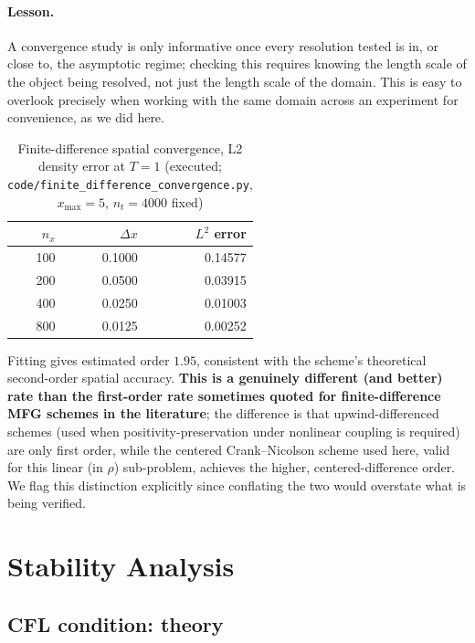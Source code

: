 \documentclass[11pt]{article}
\theoremstyle{remark}
\begin{document}
\paragraph{Lesson.} A convergence study is only informative once every resolution
tested is in, or close to, the asymptotic regime; checking this requires knowing
the length scale of the object being resolved, not just the length scale of the
domain. This is easy to overlook precisely when working with the same domain
across an experiment for convenience, as we did here.

\begin{table}[ht]
\centering
\caption{Finite-difference spatial convergence, L2 density error at $T=1$
(executed; \texttt{code/finite\_difference\_convergence.py}, $x_{\max}=5$,
$n_t=4000$ fixed)}
\label{tab:fd-results}
\begin{tabular}{rrr}
\toprule
$n_x$ & $\Delta x$ & $L^2$ error \\
\midrule
100 & 0.1000  & 0.14577 \\
200 & 0.0500  & 0.03915 \\
400 & 0.0250  & 0.01003 \\
800 & 0.0125  & 0.00252 \\
\bottomrule
\end{tabular}
\end{table}

Fitting gives estimated order $1.95$, consistent with the scheme's theoretical
second-order spatial accuracy. \textbf{This is a genuinely different (and
better) rate than the first-order rate sometimes quoted for finite-difference
MFG schemes in the literature}; the difference is that upwind-differenced
schemes (used when positivity-preservation under nonlinear coupling is required)
are only first order, while the centered Crank--Nicolson scheme used here, valid
for this linear (in $\rho$) sub-problem, achieves the higher, centered-difference
order. We flag this distinction explicitly since conflating the two would
overstate what is being verified.

\section{Stability Analysis}
\label{sec:stability}

\subsection{CFL condition: theory}
\end{document}
